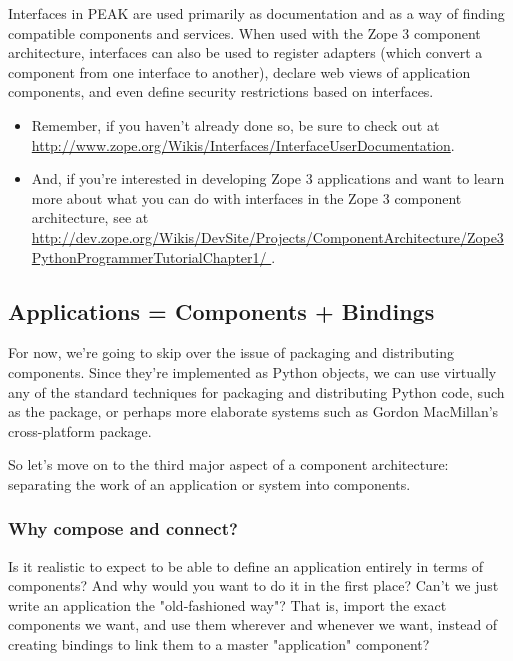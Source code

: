 Interfaces in PEAK are used primarily as documentation and as a way of finding
compatible components and services.  When used with the Zope 3 component
architecture, interfaces can also be used to register adapters (which convert
a component from one interface to another), declare web views of application
components, and even define security restrictions based on interfaces.  

\vfill
\begin{seealso}\begin{itemize}

\item Remember, if you haven't already done so, be sure to check out
 at 
\url{http://www.zope.org/Wikis/Interfaces/InterfaceUserDocumentation}.  

\item And, if you're interested in developing Zope 3 applications and want to
learn more about what you can do with interfaces in the Zope 3 component
architecture, see  at \url{http://dev.zope.org/Wikis/DevSite/Projects/ComponentArchitecture/Zope3PythonProgrammerTutorialChapter1/
}.

\end{itemize}\end{seealso}
\vfill


\subsection{Applications = Components + Bindings}

For now, we're going to skip over the issue of packaging and distributing
components.  Since they're implemented as Python objects, we can use virtually
any of the standard techniques for packaging and distributing Python code,
such as the  package, or perhaps more elaborate systems such
as Gordon MacMillan's cross-platform  package.

So let's move on to the third major aspect of a component architecture:
separating the work of an application or system into components.


\subsubsection{Why compose and connect?}

Is it realistic to expect to be able to define an application entirely in
terms of components?  And why would you want to do it in the first place?
Can't we just write an application the "old-fashioned way"?  That is,
import the exact components we want, and use them wherever and whenever
we want, instead of creating bindings to link them to a master "application"
component?

